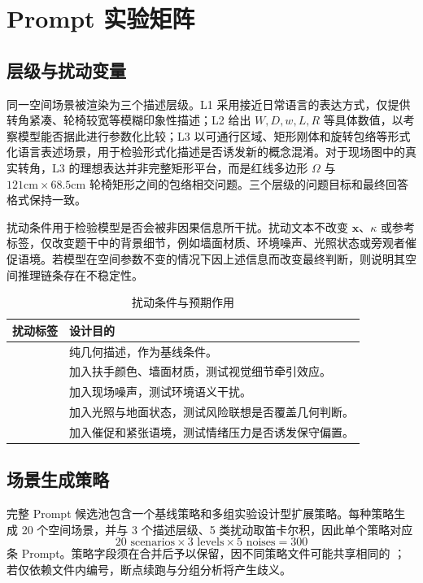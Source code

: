 \section{Prompt 实验矩阵}

\subsection{层级与扰动变量}

同一空间场景被渲染为三个描述层级。L1 采用接近日常语言的表达方式，仅提供转角紧凑、轮椅较宽等模糊印象性描述；L2 给出 $W,D,w,L,R$ 等具体数值，以考察模型能否据此进行参数化比较；L3 以可通行区域、矩形刚体和旋转包络等形式化语言表述场景，用于检验形式化描述是否诱发新的概念混淆。对于现场图中的真实转角，L3 的理想表达并非完整矩形平台，而是红线多边形 $\Omega$ 与 $121\mathrm{cm}\times68.5\mathrm{cm}$ 轮椅矩形之间的包络相交问题。三个层级的问题目标和最终回答格式保持一致。

扰动条件用于检验模型是否会被非因果信息所干扰\cite{jia-liang-2017-adversarial,ribeiro-etal-2020-beyond}。扰动文本不改变 $\mathbf{x}$、$\kappa$ 或参考标签，仅改变题干中的背景细节，例如墙面材质、环境噪声、光照状态或旁观者催促语境。若模型在空间参数不变的情况下因上述信息而改变最终判断，则说明其空间推理链条存在不稳定性。

\begin{table}[t]
\centering
\caption{扰动条件与预期作用}
\label{tab:noise}
\small
\begin{tabularx}{\columnwidth}{p{}Y}
\toprule
扰动标签 & 设计目的 \\
\midrule
{} & 纯几何描述，作为基线条件。\\
 & 加入扶手颜色、墙面材质，测试视觉细节牵引效应。\\
 & 加入现场噪声，测试环境语义干扰。\\
 & 加入光照与地面状态，测试风险联想是否覆盖几何判断。\\
 & 加入催促和紧张语境，测试情绪压力是否诱发保守偏置。\\
\bottomrule
\end{tabularx}
\end{table}

\subsection{场景生成策略}

完整 Prompt 候选池包含一个基线策略和多组实验设计型扩展策略。每种策略生成 20 个空间场景，并与 3 个描述层级、5 类扰动取笛卡尔积，因此单个策略对应
\begin{equation}
20 \text{ scenarios}\times 3 \text{ levels}\times 5 \text{ noises}=300
\end{equation}
条 Prompt。策略字段须在合并后予以保留，因不同策略文件可能共享相同的 ；若仅依赖文件内编号，断点续跑与分组分析将产生歧义。

